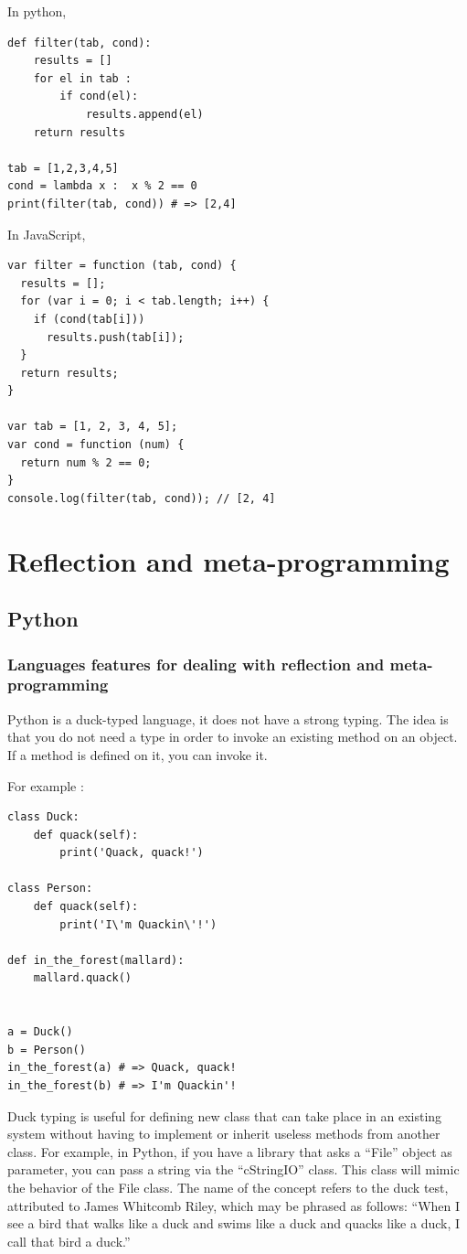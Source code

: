 \documentclass[a4paper,10pt]{article}
\begin{document}
In python,
\setpy
\begin{lstlisting}
def filter(tab, cond):
    results = []
    for el in tab :
        if cond(el):
            results.append(el)
    return results

tab = [1,2,3,4,5]
cond = lambda x :  x % 2 == 0
print(filter(tab, cond)) # => [2,4]
\end{lstlisting}

In JavaScript,
\setjs
\begin{lstlisting}
var filter = function (tab, cond) {
  results = [];
  for (var i = 0; i < tab.length; i++) {
    if (cond(tab[i]))
      results.push(tab[i]);
  }
  return results;
}

var tab = [1, 2, 3, 4, 5];
var cond = function (num) {
  return num % 2 == 0;
}
console.log(filter(tab, cond)); // [2, 4]
\end{lstlisting}

\section{Reflection and meta-programming}

\subsection{Python}
\setpy{}
\subsubsection{Languages features for dealing with reflection and meta-programming}
\setpy{}
Python is a duck-typed language, it does not have a strong typing. The idea is that you do not need a type in order to invoke an existing method on an object. If a method is defined on it, you can invoke it. 

For example :

\begin{lstlisting}
class Duck:
    def quack(self):
        print('Quack, quack!')
 
class Person:
    def quack(self):
        print('I\'m Quackin\'!')

def in_the_forest(mallard):
    mallard.quack()


a = Duck()
b = Person()
in_the_forest(a) # => Quack, quack!
in_the_forest(b) # => I'm Quackin'!
\end{lstlisting}

Duck typing is useful for defining new class that can take place in an existing system without having to implement or inherit useless methods from another class. For example, in Python, if you have a library that asks a “File” object as parameter, you can pass a string via the  “cStringIO” class. This class will mimic the behavior of the File class. The name of the concept refers to the duck test, attributed to James Whitcomb Riley, which may be phrased as follows: “When I see a bird that walks like a duck and swims like a duck and quacks like a duck, I call that bird a duck.”
\end{document}

